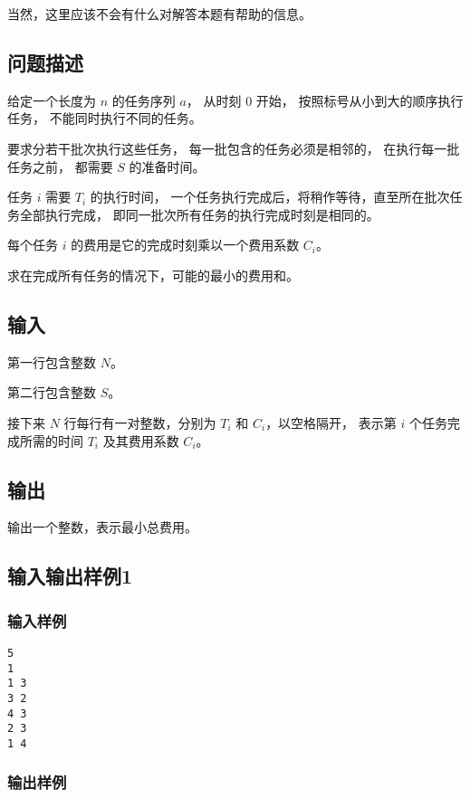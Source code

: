 \documentclass[UTF8]{ctexart}
\begin{document}
当然，这里应该不会有什么对解答本题有帮助的信息。

\subsection{问题描述}

给定一个长度为 $n$ 的任务序列 $a$， 从时刻 $0$ 开始， 按照标号从小到大的顺序执行任务， 不能同时执行不同的任务。

要求分若干批次执行这些任务， 每一批包含的任务必须是相邻的， 在执行每一批任务之前， 都需要 $S$ 的准备时间。

任务 $i$ 需要 $T_i$ 的执行时间， 一个任务执行完成后，将稍作等待，直至所在批次任务全部执行完成， 即同一批次所有任务的执行完成时刻是相同的。

每个任务 $i$ 的费用是它的完成时刻乘以一个费用系数 $C_i$。

求在完成所有任务的情况下，可能的最小的费用和。

\subsection{输入} 

第一行包含整数 $N$。

第二行包含整数 $S$。

接下来 $N$ 行每行有一对整数，分别为 $T_i$ 和 $C_i$，以空格隔开， 表示第 $i$ 个任务完成所需的时间 $T_i$ 及其费用系数 $C_i$。

\subsection{输出}

输出一个整数，表示最小总费用。

\subsection{输入输出样例1}

\subsubsection{输入样例}

\begin{lstlisting}
5
1
1 3
3 2
4 3
2 3
1 4
\end{lstlisting}

\subsubsection{输出样例}
\end{document}

